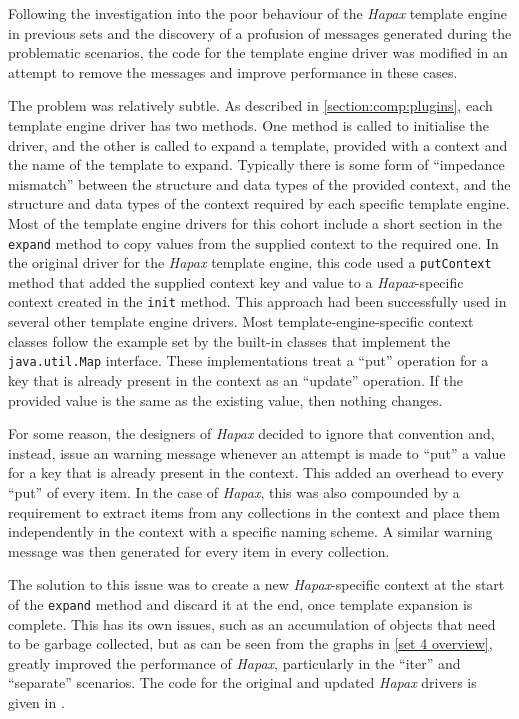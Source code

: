 \label{small changes}
Following the investigation into the poor behaviour of the \emph{Hapax} \gls{template engine} in previous sets and the discovery of a profusion of messages generated during the problematic scenarios, the code for the \gls{template engine} driver was modified in an attempt to remove the messages and improve performance in these cases.

The problem was relatively subtle. As described in \autoref{section:comp:plugins}, each \gls{template engine} driver has two methods. One method is called to initialise the driver, and the other is called to expand a template, provided with a context and the name of the template to expand. Typically there is some form of \enquote{impedance mismatch} between the structure and data types of the provided context, and the structure and data types of the context required by each specific \gls{template engine}. Most of the \gls{template engine} drivers for this cohort include a short section in the \verb!expand! method to copy values from the supplied context to the required one. In the original driver for the \emph{Hapax} \gls{template engine}, this code used a \verb!putContext! method that added the supplied context key and value to a \emph{Hapax}-specific context created in the \verb!init! method. This approach had been successfully used in several other \gls{template engine} drivers. Most template-engine-specific context classes follow the example set by the built-in classes that implement the \verb!java.util.Map! interface. These implementations treat a \enquote{put} operation for a key that is already present in the context as an \enquote{update} operation. If the provided value is the same as the existing value, then nothing changes.

For some reason, the designers of \emph{Hapax} decided to ignore that convention and, instead, issue an warning message whenever an attempt is made to \enquote{put} a value for a key that is already present in the context. This added an overhead to every \enquote{put} of every item. In the case of \emph{Hapax}, this was also compounded by a requirement to extract items from any collections in the context and place them independently in the context with a specific naming scheme. A similar warning message was then generated for every item in every collection.

The solution to this issue was to create a new \emph{Hapax}-specific context at the start of the \verb!expand! method and discard it at the end, once template expansion is complete. This has its own issues, such as an accumulation of objects that need to be garbage collected, but as can be seen from the graphs in \autoref{set 4 overview}, greatly improved the performance of \emph{Hapax}, particularly in the \enquote{iter} and \enquote{separate} scenarios. The code for the original and updated \emph{Hapax} drivers is given in .


